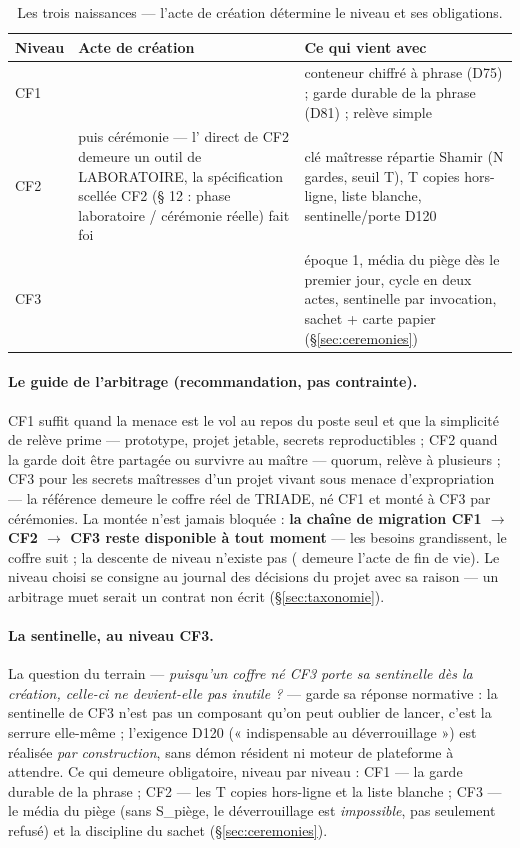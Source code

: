 \begin{table}[htbp]
\centering\small
\caption{Les trois naissances — l'acte de création détermine le niveau et ses obligations.}
\label{tab:naissances}
\begin{tabularx}{\textwidth}{@{}l >{\raggedright\arraybackslash}p{4.6cm} Y@{}}
\toprule
\textbf{Niveau} & \textbf{Acte de création} & \textbf{Ce qui vient avec} \\
\midrule
CF1 &  & conteneur chiffré à phrase (D75) ; garde durable
de la phrase (D81) ; relève simple \\
CF2 &  puis cérémonie  —
l' direct de CF2 demeure un outil de LABORATOIRE, la spécification
scellée CF2 (§ 12 : phase laboratoire / cérémonie réelle) fait foi & clé maîtresse
répartie Shamir (N gardes, seuil T), T copies hors-ligne, liste blanche,
sentinelle/porte D120 \\
CF3 &  & époque 1, média du piège dès le premier jour,
cycle en deux actes, sentinelle par invocation, sachet + carte papier
(§\ref{sec:ceremonies}) \\
\bottomrule
\end{tabularx}
\end{table}

\paragraph{Le guide de l'arbitrage (recommandation, pas contrainte).} CF1 suffit
quand la menace est le vol au repos du poste seul et que la simplicité de relève
prime — prototype, projet jetable, secrets reproductibles ; CF2 quand la garde doit
être partagée ou survivre au maître — quorum, relève à plusieurs ; CF3 pour les
secrets maîtresses d'un projet vivant sous menace d'expropriation — la référence
demeure le coffre réel de TRIADE, né CF1 et monté à CF3 par cérémonies. La montée
n'est jamais bloquée : \textbf{la chaîne de migration CF1 $\to$ CF2 $\to$ CF3 reste
disponible à tout moment} — les besoins grandissent, le coffre suit ; la descente de
niveau n'existe pas ( demeure l'acte de fin de vie). Le niveau choisi se
consigne au journal des décisions du projet avec sa raison — un arbitrage muet serait
un contrat non écrit (§\ref{sec:taxonomie}).

\paragraph{La sentinelle, au niveau CF3.} La question du terrain — \emph{puisqu'un
coffre né CF3 porte sa sentinelle dès la création, celle-ci ne devient-elle pas
inutile ?} — garde sa réponse normative : la sentinelle de CF3 n'est pas un composant
qu'on peut oublier de lancer, c'est la serrure elle-même ; l'exigence D120
(« indispensable au déverrouillage ») est réalisée \emph{par construction}, sans
démon résident ni moteur de plateforme à attendre. Ce qui demeure obligatoire, niveau
par niveau : CF1 — la garde durable de la phrase ; CF2 — les T copies hors-ligne et
la liste blanche ; CF3 — le média du piège (sans S\_piège, le déverrouillage est
\emph{impossible}, pas seulement refusé) et la discipline du sachet
(§\ref{sec:ceremonies}).

